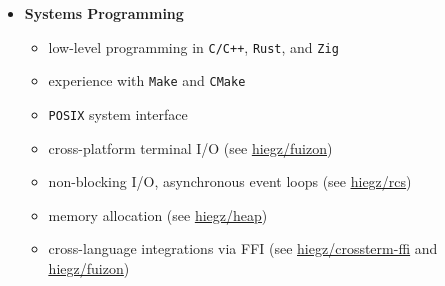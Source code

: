 \documentclass[]{article}
\begin{document}
\begin{minipage}[t]{0.49\linewidth}
    \begin{itemize}[leftmargin=0.15in, rightmargin=0.15in, label={}]
        \item {\large\bfseries Systems Programming}

            \begin{itemize}
                \item low-level programming in \verb|C/C++|, \verb|Rust|, and \verb|Zig|
                \item experience with \verb|Make| and \verb|CMake|
                \item \verb|POSIX| system interface
                \item cross-platform terminal I/O (see \href{https://github.com/hiegz/fuizon}{\ttfamily \underline{hiegz/fuizon}})
                \item non-blocking I/O, asynchronous event loops (see \href{https://github.com/hiegz/rcs}{\ttfamily \underline{hiegz/rcs}})
                \item memory allocation (see \href{https://github.com/hiegz/heap}{\ttfamily \underline{hiegz/heap}})
                \item cross-language integrations via FFI (see
                    \href{https://github.com/hiegz/crossterm-ffi}{\ttfamily \underline{hiegz/crossterm-ffi}} and
                    \href{https://github.com/hiegz/fuizon}{\ttfamily \underline{hiegz/fuizon}})
            \end{itemize}
    \end{itemize}
\end{minipage}
\hspace{10pt}
\end{document}
